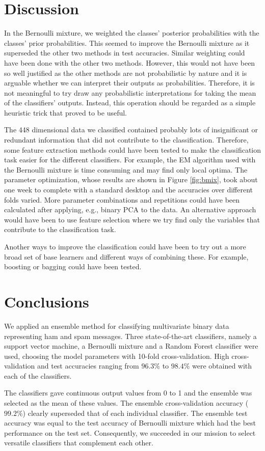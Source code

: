 \section{Discussion}

In the Bernoulli mixture, we weighted the classes' posterior
probabilities with the classes' prior probabilities. This seemed to
improve the Bernoulli mixture as it superseded the other two methods in
test accuracies. Similar weighting could have been done with the other
two methods. However, this would not have been so well justified as the
other methods are not probabilistic by nature and it is arguable whether
we can interpret their outputs as probabilities. Therefore, it is not
meaningful to try draw any probabilistic interpretations for taking the
mean of the classifiers' outputs. Instead, this operation should be
regarded as a simple heuristic trick that proved to be useful.

The 448 dimensional data we classified contained probably lots of
insignificant or redundant information that did not contribute to the
classification. Therefore, some feature extraction methods could have
been tested to make the classification task easier for the different
classifiers. For example, the EM algorithm used with the Bernoulli
mixture is time consuming and may find only local optima. The parameter
optimization, whose results are shown in Figure \ref{fig:bmix}, took
about one week to complete with a standard desktop and the accuracies
over different folds varied. More parameter combinations and repetitions
could have been calculated after applying, e.g., binary PCA to the data.
An alternative approach would have been to use feature selection where
we try find only the variables that contribute to the classification
task.

Another ways to improve the classification could have been to try out a
more broad set of base learners and different ways of combining these.
For example, boosting or bagging could have been tested.

\section{Conclusions}

We applied an ensemble method for classifying multivariate binary data
representing ham and spam messages. Three state-of-the-art classifiers,
namely a support vector machine, a Bernoulli mixture and a Random Forest
classifier were used, choosing the model parameters with 10-fold
cross-validation. High cross-validation and test accuracies ranging from
$96.3 \%$ to $98.4 \%$ were obtained with each of the classifiers.

The classifiers gave continuous output values from 0 to 1 and the
ensemble was selected as the mean of these values. The ensemble
cross-validation accuracy ($99.2 \%$) clearly superseded that of each
individual classifier. The ensemble test accuracy was equal to the test
accuracy of Bernoulli mixture which had the best performance on the test
set. Consequently, we succeeded in our mission to select versatile
classifiers that complement each other.

